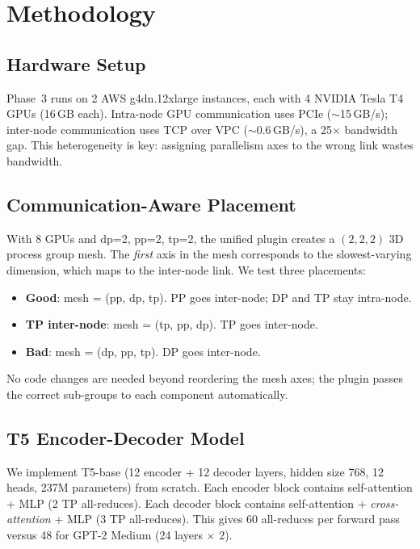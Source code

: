 \documentclass[conference]{IEEEtran}
\begin{document}
\section{Methodology}

\subsection{Hardware Setup}

Phase~3 runs on 2 AWS g4dn.12xlarge instances, each with 4 NVIDIA Tesla T4 GPUs (16\,GB each). Intra-node GPU communication uses PCIe ($\sim$15\,GB/s); inter-node communication uses TCP over VPC ($\sim$0.6\,GB/s), a 25$\times$ bandwidth gap. This heterogeneity is key: assigning parallelism axes to the wrong link wastes bandwidth.

\subsection{Communication-Aware Placement}

With 8 GPUs and dp=2, pp=2, tp=2, the unified plugin creates a $(2,2,2)$ 3D process group mesh. The \textit{first} axis in the mesh corresponds to the slowest-varying dimension, which maps to the inter-node link. We test three placements:

\begin{itemize}
\item \textbf{Good}: mesh = (pp, dp, tp). PP goes inter-node; DP and TP stay intra-node.
\item \textbf{TP inter-node}: mesh = (tp, pp, dp). TP goes inter-node.
\item \textbf{Bad}: mesh = (dp, pp, tp). DP goes inter-node.
\end{itemize}

No code changes are needed beyond reordering the mesh axes; the plugin passes the correct sub-groups to each component automatically.

\subsection{T5 Encoder-Decoder Model}

We implement T5-base (12 encoder + 12 decoder layers, hidden size 768, 12 heads, 237M parameters) from scratch. Each encoder block contains self-attention + MLP (2 TP all-reduces). Each decoder block contains self-attention + \textit{cross-attention} + MLP (3 TP all-reduces). This gives 60 all-reduces per forward pass versus 48 for GPT-2 Medium (24 layers $\times$ 2).
\end{document}
